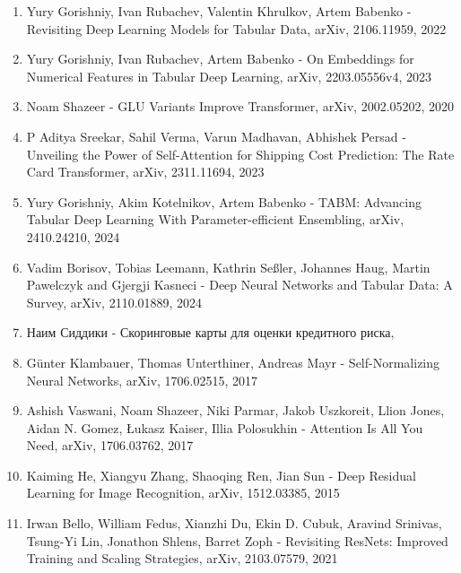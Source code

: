 \documentclass[12pt]{article}
\begin{document}
\begin{enumerate}

    \item Yury Gorishniy, Ivan Rubachev, Valentin Khrulkov, Artem Babenko - Revisiting Deep Learning Models for Tabular Data, arXiv, 2106.11959, 2022
    
    \item Yury Gorishniy, Ivan Rubachev, Artem Babenko - On Embeddings for Numerical Features in Tabular Deep Learning, arXiv, 2203.05556v4, 2023
    
    \item Noam Shazeer - GLU Variants Improve Transformer, arXiv, 2002.05202, 2020
    
    \item P Aditya Sreekar, Sahil Verma, Varun Madhavan, Abhishek Persad - Unveiling the Power of Self-Attention for Shipping Cost Prediction: The Rate Card Transformer, arXiv, 2311.11694, 2023
    
    \item Yury Gorishniy, Akim Kotelnikov, Artem Babenko -
    TABM: Advancing Tabular Deep Learning With Parameter-efficient Ensembling, arXiv, 2410.24210, 2024
    
    \item Vadim Borisov, Tobias Leemann, Kathrin Seßler, Johannes Haug, Martin Pawelczyk and Gjergji Kasneci - Deep Neural Networks and Tabular Data: A Survey, arXiv, 2110.01889, 2024
    
    \item Наим Сиддики - Скоринговые карты для оценки кредитного риска, 
    
    \item Günter Klambauer, Thomas Unterthiner, Andreas Mayr - Self-Normalizing Neural Networks, arXiv, 1706.02515, 2017
    
    \item Ashish Vaswani, Noam Shazeer, Niki Parmar, Jakob Uszkoreit, Llion Jones, Aidan N. Gomez, Łukasz Kaiser, Illia Polosukhin - Attention Is All You Need, arXiv, 1706.03762, 2017
    
    \item Kaiming He, Xiangyu Zhang, Shaoqing Ren, Jian Sun - Deep Residual Learning for Image Recognition, arXiv, 1512.03385, 2015

    \item Irwan Bello, William Fedus, Xianzhi Du, Ekin D. Cubuk, Aravind Srinivas, Tsung-Yi Lin, Jonathon Shlens, Barret Zoph - Revisiting ResNets: Improved Training and Scaling Strategies, arXiv, 2103.07579, 2021


\end{enumerate}
\end{document}
